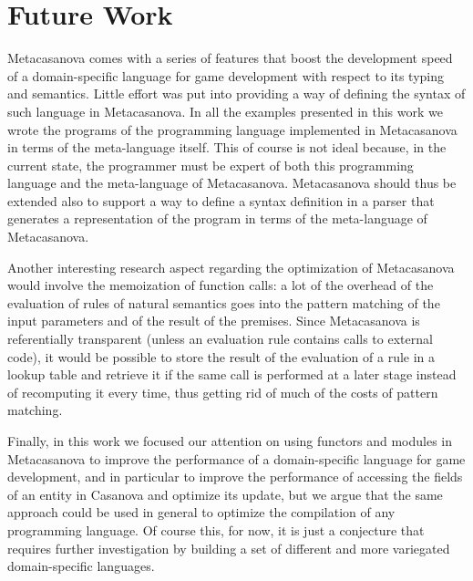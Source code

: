 \section{Future Work}
\label{sec:ch_conclusion_future_work}
Metacasanova comes with a series of features that boost the development speed of a domain-specific language for game development with respect to its typing and semantics. Little effort was put into providing a way of defining the syntax of such language in Metacasanova. In all the examples presented in this work we wrote the programs of the programming language implemented in Metacasanova in terms of the meta-language itself. This of course is not ideal because, in the current state, the programmer must be expert of both this programming language and the meta-language of Metacasanova. Metacasanova should thus be extended also to support a way to define a syntax definition in a parser that generates a representation of the program in terms of the meta-language of Metacasanova.

Another interesting research aspect regarding the optimization of Metacasanova would involve the memoization of function calls: a lot of the overhead of the evaluation of rules of natural semantics goes into the pattern matching of the input parameters and of the result of the premises. Since Metacasanova is referentially transparent (unless an evaluation rule contains calls to external code), it would be possible to store the result of the evaluation of a rule in a lookup table and retrieve it if the same call is performed at a later stage instead of recomputing it every time, thus getting rid of much of the costs of pattern matching.

Finally, in this work we focused our attention on using functors and modules in Metacasanova to improve the performance of a domain-specific language for game development, and in particular to improve the performance of accessing the fields of an entity in Casanova and optimize its update, but we argue that the same approach could be used in general to optimize the compilation of any programming language. Of course this, for now, it is just a conjecture that requires further investigation by building a set of different and more variegated domain-specific languages.

